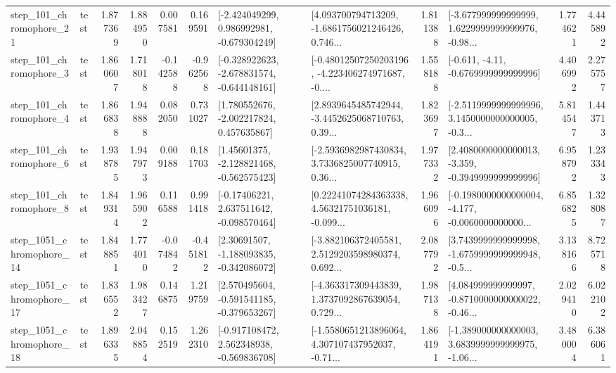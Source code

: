 \begin{tabular}{llrrrrllrlrr}
  step\_101\_chromophore\_21 &      test &      1.877369 &    1.884950 &      0.007581 &  0.169591 &   [-2.424049299, 0.986992981, -0.679304249] &  [4.093700794713209, -1.6861756021246426, 0.746... &       1.811388 &  [-3.677999999999999, 1.6229999999999976, -0.98... &            1.774621 &          4.445892 \\
   step\_101\_chromophore\_3 &      test &      1.860607 &    1.718018 &     -0.142588 & -0.962568 &  [-0.328922623, -2.678831574, -0.644148161] &  [-0.48012507250203196, -4.223406274971687, -0.... &       1.558188 &               [-0.611, -4.11, -0.6769999999999996] &            4.406992 &          2.275757 \\
   step\_101\_chromophore\_4 &      test &      1.866838 &    1.948888 &      0.082050 &  0.731027 &    [1.780552676, -2.002217824, 0.457635867] &  [2.8939645485742944, -3.4452625068710763, 0.39... &       1.823697 &  [-2.5119999999999996, 3.1450000000000005, -0.3... &            5.814547 &          1.443713 \\
   step\_101\_chromophore\_6 &      test &      1.938785 &    1.947973 &      0.009188 &  0.181703 &    [1.45601375, -2.128821468, -0.562575423] &  [-2.5936982987430834, 3.7336825007740915, 0.36... &       1.977332 &  [2.4080000000000013, -3.359, -0.3949999999999996] &            6.958792 &          1.233343 \\
   step\_101\_chromophore\_8 &      test &      1.849314 &    1.965902 &      0.116588 &  0.991418 &    [-0.17406221, 2.637511642, -0.098570464] &  [0.22241074284363338, 4.56321751036181, -0.099... &       1.966096 &  [-0.1980000000000004, -4.177, -0.0060000000000... &            6.856825 &          1.328087 \\
 step\_1051\_chromophore\_14 &      test &      1.848851 &    1.774010 &     -0.074842 & -0.451812 &    [2.30691507, -1.188093835, -0.342086072] &  [-3.882106372405581, 2.5129203598980374, 0.692... &       2.087792 &  [3.7439999999999998, -1.6759999999999948, -0.5... &            3.138166 &          8.725718 \\
 step\_1051\_chromophore\_17 &      test &      1.836552 &    1.983427 &      0.146875 &  1.219759 &   [2.570495604, -0.591541185, -0.379653267] &  [-4.363317309443839, 1.3737092867639054, 0.729... &       1.987138 &  [4.084999999999997, -0.8710000000000022, -0.46... &            2.029410 &          6.022102 \\
 step\_1051\_chromophore\_18 &      test &      1.896335 &    2.048854 &      0.152519 &  1.262310 &   [-0.917108472, 2.562348938, -0.569836708] &  [-1.5580651213896064, 4.307107437952037, -0.71... &       1.864191 &  [-1.389000000000003, 3.6839999999999975, -1.06... &            3.480004 &          6.386061 \\

\end{tabular}
